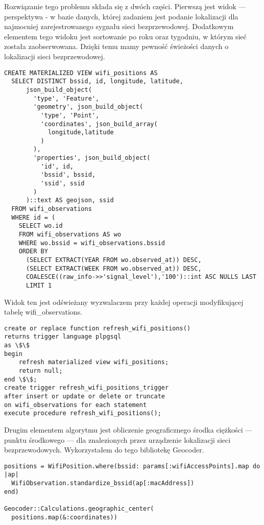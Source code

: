 Rozwiązanie tego problemu składa się z dwóch części. Pierwszą jest widok — perspektywa - w bazie danych, której zadaniem jest podanie lokalizacji dla najmocniej zarejestrowanego sygnału sieci bezprzewodowej. Dodatkowym elementem tego widoku jest sortowanie po roku oraz tygodniu, w którym sieć została zaobserwowana. Dzięki temu mamy pewność świeżości danych o lokalizacji sieci bezprzewodowej.

\begin{verbatim}
CREATE MATERIALIZED VIEW wifi_positions AS
  SELECT DISTINCT bssid, id, longitude, latitude,
      json_build_object(
        'type', 'Feature',
        'geometry', json_build_object(
          'type', 'Point',
          'coordinates', json_build_array(
            longitude,latitude
          )
        ),
        'properties', json_build_object(
          'id', id,
          'bssid', bssid,
          'ssid', ssid
        )
      )::text AS geojson, ssid
  FROM wifi_observations
  WHERE id = (
    SELECT wo.id
    FROM wifi_observations AS wo
    WHERE wo.bssid = wifi_observations.bssid
    ORDER BY
      (SELECT EXTRACT(YEAR FROM wo.observed_at)) DESC,
      (SELECT EXTRACT(WEEK FROM wo.observed_at)) DESC,
      COALESCE((raw_info->>'signal_level'),'100')::int ASC NULLS LAST
      LIMIT 1
\end{verbatim}

Widok ten jest odświeżany wyzwalaczem przy każdej operacji modyfikującej tabelę wifi\_observations.

\begin{verbatim}
create or replace function refresh_wifi_positions()
returns trigger language plpgsql
as \$\$
begin
    refresh materialized view wifi_positions;
    return null;
end \$\$;
create trigger refresh_wifi_positions_trigger
after insert or update or delete or truncate
on wifi_observations for each statement
execute procedure refresh_wifi_positions();
\end{verbatim}

Drugim elementem algorytmu jest obliczenie geograficznego środka ciężkości — punktu środkowego — dla znalezionych przez urządzenie lokalizacji sieci bezprzewodowych. Wykorzystałem do tego bibliotekę Geocoder.

\begin{verbatim}
positions = WifiPosition.where(bssid: params[:wifiAccessPoints].map do |ap|
  WifiObservation.standardize_bssid(ap[:macAddress])
end)

Geocoder::Calculations.geographic_center(
  positions.map(&:coordinates))
\end{verbatim}

